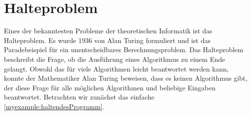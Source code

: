 








\section{Halteproblem}
Eines der bekanntesten Probleme der theoretischen Informatik ist das Halteproblem. Es wurde 1936 von Alan Turing formuliert und ist das Paradebeispiel für ein unentscheidbares Berechnungsproblem.
Das Halteproblem beschreibt die Frage, ob die Ausführung eines Algorithmus zu einem Ende gelangt. Obwohl das für viele Algorithmen leicht beantwortet werden kann, konnte der Mathematiker Alan Turing beweisen, dass es keinen Algorithmus gibt, der diese Frage für alle möglichen Algorithmen und beliebige Eingaben beantwortet. Betrachten wir zunächst das einfache \cref{myexample:haltendesProgramm}.

